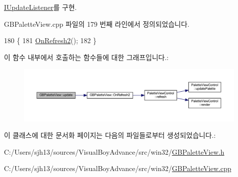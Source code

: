 \mbox{\hyperlink{class_i_update_listener_ac03b85f52e858d0bbd08a4984b2cb929}{I\+Update\+Listener}}를 구현.



G\+B\+Palette\+View.\+cpp 파일의 179 번째 라인에서 정의되었습니다.


\begin{DoxyCode}
180 \{
181   \mbox{\hyperlink{class_g_b_palette_view_a15d94f40712405e466296772b7087f3f}{OnRefresh2}}();
182 \}
\end{DoxyCode}
이 함수 내부에서 호출하는 함수들에 대한 그래프입니다.\+:
\nopagebreak
\begin{figure}[H]
\begin{center}
\leavevmode
\includegraphics[width=350pt]{class_g_b_palette_view_a43a43edd82e080e860aeb6a82ec106fc_cgraph}
\end{center}
\end{figure}


이 클래스에 대한 문서화 페이지는 다음의 파일들로부터 생성되었습니다.\+:\begin{DoxyCompactItemize}
\item 
C\+:/\+Users/sjh13/sources/\+Visual\+Boy\+Advance/src/win32/\mbox{\hyperlink{_g_b_palette_view_8h}{G\+B\+Palette\+View.\+h}}\item 
C\+:/\+Users/sjh13/sources/\+Visual\+Boy\+Advance/src/win32/\mbox{\hyperlink{_g_b_palette_view_8cpp}{G\+B\+Palette\+View.\+cpp}}\end{DoxyCompactItemize}
